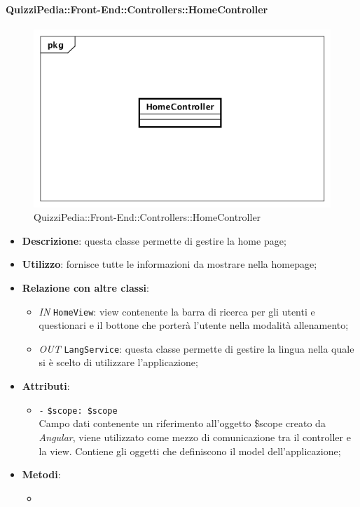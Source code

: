 \paragraph{QuizziPedia::Front-End::Controllers::HomeController}
\begin{figure}
	\centering
	\includegraphics[scale=0.45]{UML/Classi/Front-End/QuizziPedia_Front-end_Controller_HomeController.png}
	\caption{QuizziPedia::Front-End::Controllers::HomeController}
\end{figure}
\begin{itemize}
	\item \textbf{Descrizione}: questa classe permette di gestire la home page;
	\item \textbf{Utilizzo}: fornisce tutte le informazioni da mostrare nella homepage;
	\item \textbf{Relazione con altre classi}:
	\begin{itemize}
		\item \textit{IN} \texttt{HomeView}: view contenente la barra di ricerca per gli utenti e questionari e il bottone che porterà l'utente nella modalità allenamento;
		\item \textit{OUT} \texttt{LangService}: questa classe permette di gestire la lingua nella quale si è scelto di utilizzare l'applicazione;
	\end{itemize}
	\item \textbf{Attributi}:
	\begin{itemize}
		\item \texttt{-} \texttt{\$scope: \$scope} \\
		Campo dati contenente un riferimento all’oggetto \$scope creato da \textit{Angular}, viene utilizzato come mezzo di comunicazione tra il controller e la view. Contiene gli oggetti che definiscono il model dell’applicazione;
	\end{itemize}
	\item \textbf{Metodi}:
	\begin{itemize}
		\item 
	\end{itemize}
\end{itemize}

